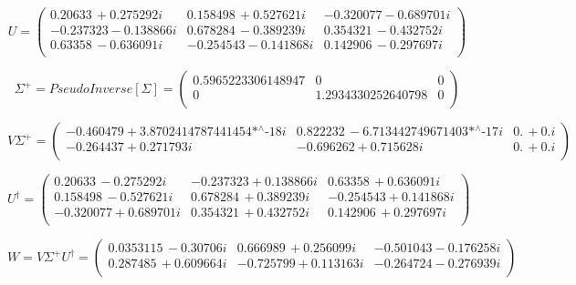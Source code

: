 \begin{equation}
U=\left(
\begin{array}{ccc}
 0.20633\, +0.275292 i & 0.158498\, +0.527621 i & -0.320077-0.689701 i \\
 -0.237323-0.138866 i & 0.678284\, -0.389239 i & 0.354321\, -0.432752 i \\
 0.63358\, -0.636091 i & -0.254543-0.141868 i & 0.142906\, -0.297697 i \\
\end{array}
\right)
\end{equation}

\begin{equation}
\Sigma^{+}=PseudoInverse[\Sigma]=\left(
\begin{array}{ccc}
 0.5965223306148947  & 0 & 0 \\
0 &1.2934330252640798 & 0  \\
\end{array}
\right)
\end{equation}



\begin{equation}
V \Sigma^{+}=\left(
\begin{array}{ccc}
 -0.460479+\text{3.8702414787441454$\grave{ }$*${}^{\wedge}$-18} i & 0.822232\, -\text{6.713442749671403$\grave{ }$*${}^{\wedge}$-17} i & 0.\, +0. i \\
 -0.264437+0.271793 i & -0.696262+0.715628 i & 0.\, +0. i \\
\end{array}
\right)
\end{equation}


\begin{equation}
U^{\dagger}=\left(
\begin{array}{ccc}
 0.20633\, -0.275292 i & -0.237323+0.138866 i & 0.63358\, +0.636091 i \\
 0.158498\, -0.527621 i & 0.678284\, +0.389239 i & -0.254543+0.141868 i \\
 -0.320077+0.689701 i & 0.354321\, +0.432752 i & 0.142906\, +0.297697 i \\
\end{array}
\right)
\end{equation}


\begin{equation}
W=V \Sigma^{+} U^{\dagger}=\left(
\begin{array}{ccc}
 0.0353115\, -0.30706 i & 0.666989\, +0.256099 i & -0.501043-0.176258 i \\
 0.287485\, +0.609664 i & -0.725799+0.113163 i & -0.264724-0.276939 i \\
\end{array}
\right)
\end{equation}

